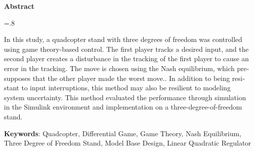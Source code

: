 


\pagestyle{empty}

\begin{latin}
	
	\begin{center}
		\textbf{Abstract}
	\end{center}
	\baselineskip=.8\baselineskip
	
	In this study, a quadcopter stand with three degrees of freedom was controlled using game theory-based control. The first player tracks a desired input, and the second player creates a disturbance in the tracking of the first player to cause an error in the tracking. The move is chosen using the Nash equilibrium, which presupposes that the other player made the worst move.. In addition to being resistant to input interruptions, this method may also be resilient to modeling system uncertainty. This method evaluated the performance through simulation in the Simulink environment and implementation on a three-degree-of-freedom stand.
	
	\bigskip\noindent\textbf{Keywords}:
	Quadcopter, Differential Game, Game Theory, Nash Equilibrium, Three Degree of Freedom Stand, Model Base Design, Linear Quadratic Regulator
	
\end{latin}

\newpage